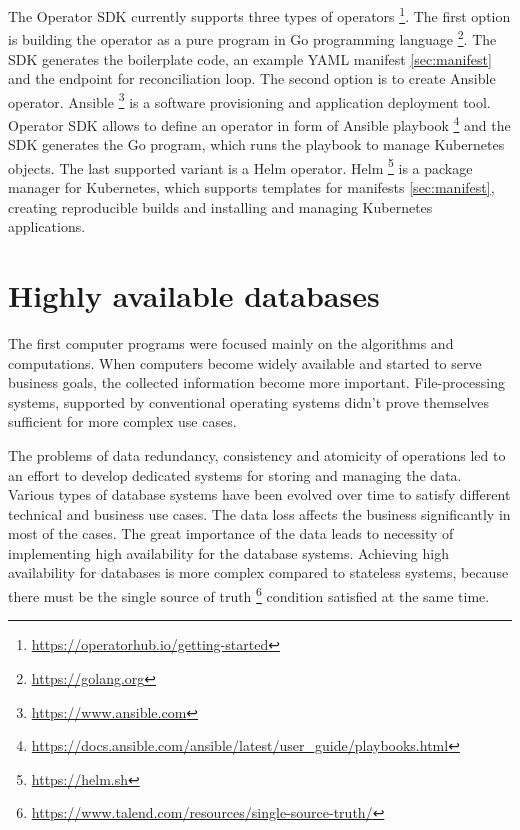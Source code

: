 \documentclass[
  digital, %
  twoside, %
  table,   %
  lof,     %
  lot,     %
]{fithesis3}
\begin{document}
The Operator SDK currently supports three types of operators \footnote{\url{https://operatorhub.io/getting-started}}. The first option is building the operator as a pure program in Go programming language \footnote{\url{https://golang.org}}. The SDK generates the boilerplate code, an example YAML manifest \ref{sec:manifest} and the endpoint for reconciliation loop. The second option is to create Ansible operator. Ansible \footnote{\url{https://www.ansible.com}} is a software provisioning and application deployment tool. Operator SDK allows to define an operator in form of Ansible playbook \footnote{\url{https://docs.ansible.com/ansible/latest/user_guide/playbooks.html}} and the SDK generates the Go program, which runs the playbook to manage Kubernetes objects. The last supported variant is a Helm operator. Helm \footnote{\url{https://helm.sh}} is a package manager for Kubernetes, which supports templates for manifests \ref{sec:manifest}, creating reproducible builds and installing and managing Kubernetes applications.  

\chapter{Highly available databases} \label{chap:ha_databases}
The first computer programs were focused mainly on the algorithms and computations. When computers become widely available and started to serve business goals, the collected information become more important. File-processing systems, supported by conventional operating systems didn't prove themselves sufficient for more complex use cases.

The problems of data redundancy, consistency and atomicity of operations led to an effort to develop dedicated systems for storing and managing the data. Various types of database systems have been evolved over time to satisfy different technical and business use cases. The data loss affects the business significantly in most of the cases. The great importance of the data leads to necessity of implementing high availability for the database systems. Achieving high availability for databases is more complex compared to stateless systems, because there must be the single source of truth \footnote{\url{https://www.talend.com/resources/single-source-truth/}} condition satisfied at the same time.
\end{document}
